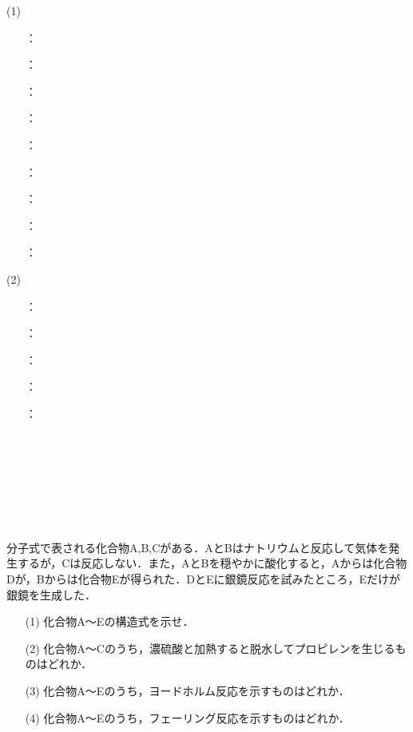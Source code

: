 \documentclass[a4paper,12pt]{ltjsreport}
\begin{document}
\ans 
\begin{minipage}{0.5\linewidth}
\noindent (1)\begin{itemize}
   \item [\fbox{ア}]：\\
  \item [\fbox{イ}]：\\
  \item [\fbox{ウ}]：\\
  \item [\fbox{エ}]：\\
  \item [\fbox{オ}]：\\
  \item [\fbox{カ}]：\\
  \item [\fbox{キ}]：\\
  \item [\fbox{ク}]：\\
  \item [\fbox{ケ}]：
\end{itemize}
\end{minipage}
\begin{minipage}{0.5\linewidth}
\noindent (2)
\begin{itemize}
    \item[\fbox{コ}]：\\
      \item [\fbox{サ}]：\\
  \item [\fbox{シ}]：\\
  \item [\fbox{ス}]：\\
    \item [　]：\\
  \item [　]　\\
  \item [　]　\\
  \item [　]　\\
  \item [　]　
\end{itemize}
\end{minipage}
\newpage
\begin{que}
分子式で表される化合物A,B,Cがある．AとBはナトリウムと反応して気体を発生するが，Cは反応しない．また，AとBを穏やかに酸化すると，Aからは化合物Dが，Bからは化合物Eが得られた．DとEに銀鏡反応を試みたところ，Eだけが銀鏡を生成した．
\begin{itemize}
    \item [(1)]化合物A〜Eの構造式を示せ．
    \item [(2)]化合物A〜Cのうち，濃硫酸と加熱すると脱水してプロピレンを生じるものはどれか．
    \item [(3)]化合物A〜Eのうち，ヨードホルム反応を示すものはどれか．
    \item [(4)]化合物A〜Eのうち，フェーリング反応を示すものはどれか．
\end{itemize}
\end{que}
\end{document}
